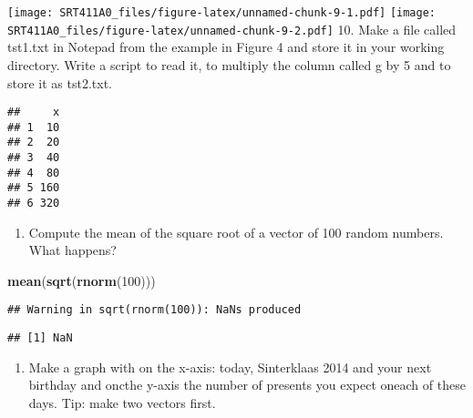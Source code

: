 \documentclass[]{article}
\newenvironment{Shaded}{\begin{snugshade}}{\end{snugshade}}
\newcommand{\KeywordTok}[1]{\textcolor[rgb]{0.13,0.29,0.53}{\textbf{#1}}}
\newcommand{\DataTypeTok}[1]{\textcolor[rgb]{0.13,0.29,0.53}{#1}}
\newcommand{\DecValTok}[1]{\textcolor[rgb]{0.00,0.00,0.81}{#1}}
\newcommand{\StringTok}[1]{\textcolor[rgb]{0.31,0.60,0.02}{#1}}
\newcommand{\OtherTok}[1]{\textcolor[rgb]{0.56,0.35,0.01}{#1}}
\newcommand{\OperatorTok}[1]{\textcolor[rgb]{0.81,0.36,0.00}{\textbf{#1}}}
\newcommand{\NormalTok}[1]{#1}
\providecommand{\tightlist}{%
  \setlength{\itemsep}{0pt}\setlength{\parskip}{0pt}}
\begin{document}
\texttt{[image: SRT411A0\_files/figure-latex/unnamed-chunk-9-1.pdf]}
\texttt{[image: SRT411A0\_files/figure-latex/unnamed-chunk-9-2.pdf]} 10.
Make a file called tst1.txt in Notepad from the example in Figure 4 and
store it in your working directory. Write a script to read it, to
multiply the column called g by 5 and to store it as tst2.txt.

\begin{Shaded}
\end{Shaded}

\begin{verbatim}
##     x
## 1  10
## 2  20
## 3  40
## 4  80
## 5 160
## 6 320
\end{verbatim}

\begin{enumerate}
\def\labelenumi{\arabic{enumi}.}
\setcounter{enumi}{10}
\tightlist
\item
  Compute the mean of the square root of a vector of 100 random numbers.
  What happens?
\end{enumerate}

\begin{Shaded}
\begin{Highlighting}[]
\KeywordTok{mean}\NormalTok{(}\KeywordTok{sqrt}\NormalTok{(}\KeywordTok{rnorm}\NormalTok{(}\DecValTok{100}\NormalTok{)))}
\end{Highlighting}
\end{Shaded}

\begin{verbatim}
## Warning in sqrt(rnorm(100)): NaNs produced
\end{verbatim}

\begin{verbatim}
## [1] NaN
\end{verbatim}

\begin{enumerate}
\def\labelenumi{\arabic{enumi}.}
\setcounter{enumi}{11}
\tightlist
\item
  Make a graph with on the x-axis: today, Sinterklaas 2014 and your next
  birthday and oncthe y-axis the number of presents you expect oneach of
  these days. Tip: make two vectors first.
\end{enumerate}
\end{document}
